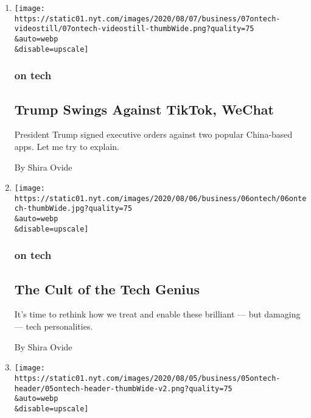 \begin{enumerate}
\def\labelenumi{\arabic{enumi}.}
\item
  \href{/2020/08/07/technology/trump-tiktok-wechat.html}{}

  \texttt{[image: https://static01.nyt.com/images/2020/08/07/business/07ontech-videostill/07ontech-videostill-thumbWide.png?quality=75\\\&auto=webp\\\&disable=upscale]}

  \hypertarget{on-tech}{%
  \subsubsection{on tech}\label{on-tech}}

  \hypertarget{trump-swings-against-tiktok-wechat}{%
  \subsection{Trump Swings Against TikTok,
  WeChat}\label{trump-swings-against-tiktok-wechat}}

  President Trump signed executive orders against two popular
  China-based apps. Let me try to explain.

  By Shira Ovide
\item
  \href{/2020/08/06/technology/the-cult-of-the-tech-genius.html}{}

  \texttt{[image: https://static01.nyt.com/images/2020/08/06/business/06ontech/06ontech-thumbWide.jpg?quality=75\\\&auto=webp\\\&disable=upscale]}

  \hypertarget{on-tech-1}{%
  \subsubsection{on tech}\label{on-tech-1}}

  \hypertarget{the-cult-of-the-tech-genius}{%
  \subsection{The Cult of the Tech
  Genius}\label{the-cult-of-the-tech-genius}}

  It's time to rethink how we treat and enable these brilliant --- but
  damaging --- tech personalities.

  By Shira Ovide
\item
  \href{/2020/08/05/technology/tech-inventions.html}{}

  \texttt{[image: https://static01.nyt.com/images/2020/08/05/business/05ontech-header/05ontech-header-thumbWide-v2.png?quality=75\\\&auto=webp\\\&disable=upscale]}


\end{enumerate}
